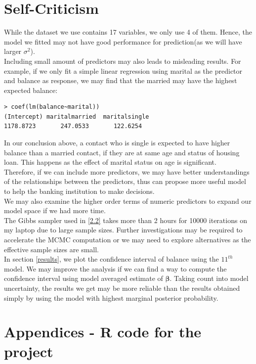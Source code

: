 \documentclass[a4page]{article}
\begin{document}
	\section{Self-Criticism\label{Self-Criticism}}
	While the dataset we use contains 17 variables, we only use 4 of them. Hence, the model we fitted may not have good performance for prediction(as we will have larger $\sigma^2$).\\ 
    Including small amount of predictors may also leads to misleading results. For example, if we only fit a simple linear regression using marital as the predictor and balance as response, we may find that the married may have the highest expected balance:
    \begin{verbatim}
> coef(lm(balance~marital))
(Intercept) maritalmarried  maritalsingle 
1178.8723       247.0533       122.6254 
    \end{verbatim}
    In our conclusion above, a contact who is single is expected to have higher balance than a married contact, if they are at same age and status of housing loan. This happens as the effect of marital status on age is significant.\\
    Therefore, if we can include more predictors, we may have better understandings of the relationships between the predictors, thus can propose more useful model to help the banking institution to make decisions.\\
    We may also examine the higher order terms of numeric predictors to expand our model space if we had more time.\\
    The Gibbs sampler used in \ref{2.2} takes more than 2 hours for 10000 iterations on my laptop due to large sample sizes. Further investigations may be required to accelerate the MCMC computation or we may need to explore alternatives as the effective sample sizes are small.\\
    In section \ref{results}, we plot the confidence interval of balance using the $11^{th}$ model. We may improve the analysis if we can find a way to compute the confidence interval using model averaged estimate of $\bm{\beta}$. Taking count into model uncertainty, the results we get may be more reliable than the results obtained simply by using the model with highest marginal posterior probability.
	\section{Appendices - R code for the project}
\end{document}
